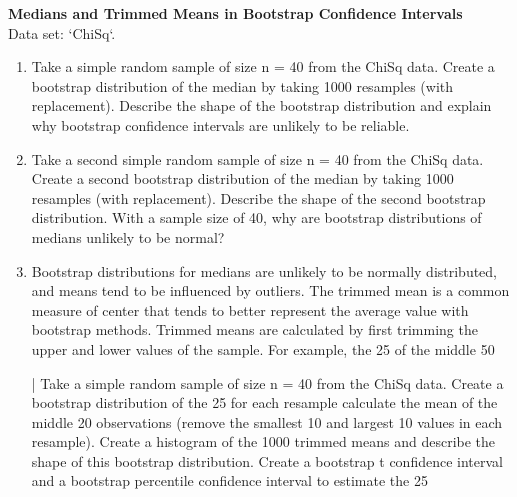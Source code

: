 \documentclass[
]{report}
\theoremstyle{definition}
\theoremstyle{definition}
\theoremstyle{definition}
\theoremstyle{definition}
\theoremstyle{remark}
\begin{document}
\begin{list}{E.}{ \setlength{\itemsep}{0.5em}}
  \item \textbf{Medians and Trimmed Means in Bootstrap Confidence Intervals} \\
  Data set: `ChiSq`. 
  \begin{enumerate}
    \setcounter{enumi}{0}  
    \item Take a simple random sample of size n = 40 from the ChiSq data. Create a bootstrap distribution
of the median by taking 1000 resamples (with replacement). Describe the shape of the bootstrap
distribution and explain why bootstrap confidence intervals are unlikely to be reliable.
    \item Take a second simple random sample of size n = 40 from the ChiSq data. Create a second bootstrap
distribution of the median by taking 1000 resamples (with replacement). Describe the shape
of the second bootstrap distribution. With a sample size of 40, why are bootstrap distributions of
medians unlikely to be normal?
    \item Bootstrap distributions for medians are unlikely to be normally distributed, and means tend to
be influenced by outliers. The trimmed mean is a common measure of center that tends to better
represent the average value with bootstrap methods. Trimmed means are calculated by first trimming
the upper and lower values of the sample. For example, the 25%
of the middle 50%

| Take a simple random sample of size n = 40 from the ChiSq data. Create a bootstrap distribution
of the 25%
for each resample calculate the mean of the middle 20 observations (remove the smallest 10 and
largest 10 values in each resample). Create a histogram of the 1000 trimmed means and describe
the shape of this bootstrap distribution. Create a bootstrap t confidence interval and a bootstrap
percentile confidence interval to estimate the 25%
  \end{enumerate}
  
  
  
  
  

\end{list}
\end{document}
